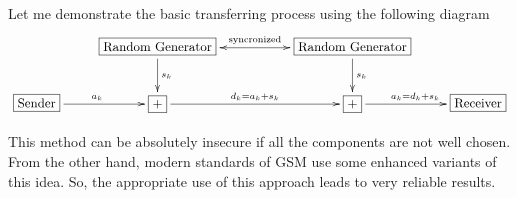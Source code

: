 Let me demonstrate the basic transferring process using the following diagram
\[
\xymatrix{
	{}&{\boxed{\text{Random Generator}}}\ar[d]^{s_k}\ar@{<->}[rr]^{\text{syncronized}}&{}&{\boxed{\text{Random Generator}}}\ar[d]^{s_k}&{}\\
	{\boxed{\text{Sender}}}\ar[r]^{a_k}&{\boxed{+}}\ar[rr]^{d_k = a_k + s_k}&{}&{\boxed{+}}\ar[r]^{a_k = d_k + s_k}&{\boxed{\text{Receiver}}}\\
}
\]

This method can be absolutely insecure if all the components are not well chosen.
From the other hand, modern standards of GSM use some enhanced variants of this idea.
So, the appropriate use of this approach leads to very reliable results.
